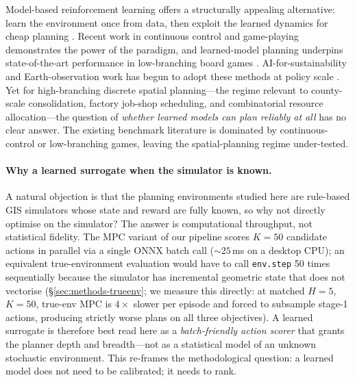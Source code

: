 \documentclass[11pt]{article}
\begin{document}
Model-based reinforcement learning offers a structurally appealing alternative: learn the environment once from data, then exploit the learned dynamics for cheap planning \citep{chua2018deep,janner2019trust,nagabandi2018neural,kurutach2018model}. Recent work in continuous control \citep{hafner2025dreamerv3,hansen2024tdmpc2,hafner2019learning} and game-playing \citep{mnih2015human,silver2017mastering,vinyals2019grandmaster,wurman2022outracing} demonstrates the power of the paradigm, and learned-model planning underpins state-of-the-art performance in low-branching board games \citep{schrittwieser2020muzero}. AI-for-sustainability and Earth-observation work has begun to adopt these methods at policy scale \citep{rolnick2022tackling,reichstein2019deep,tuia2024artificial}. Yet for high-branching discrete spatial planning---the regime relevant to county-scale consolidation, factory job-shop scheduling, and combinatorial resource allocation---the question of \emph{whether learned models can plan reliably at all} has no clear answer. The existing benchmark literature is dominated by continuous-control or low-branching games, leaving the spatial-planning regime under-tested.

\paragraph{Why a learned surrogate when the simulator is known.} A natural objection is that the planning environments studied here are rule-based GIS simulators whose state and reward are fully known, so why not directly optimise on the simulator? The answer is computational throughput, not statistical fidelity. The MPC variant of our pipeline scores $K{=}50$ candidate actions in parallel via a single ONNX batch call ($\sim 25$\,ms on a desktop CPU); an equivalent true-environment evaluation would have to call \texttt{env.step} 50 times sequentially because the simulator has incremental geometric state that does not vectorise (\S\ref{sec:methods-trueenv}; we measure this directly: at matched $H{=}5$, $K{=}50$, true-env MPC is $4\times$ slower per episode and forced to subsample stage-1 actions, producing strictly worse plans on all three objectives). A learned surrogate is therefore best read here as a \emph{batch-friendly action scorer} that grants the planner depth and breadth---not as a statistical model of an unknown stochastic environment. This re-frames the methodological question: a learned model does not need to be calibrated; it needs to rank.
\end{document}
